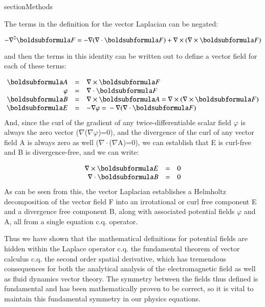\documentclass[twoside,final]{article}
\begin{document}
{section{Methods}

The terms in the definition for the vector Laplacian can be negated:

\begin{equation}
-\nabla ^2\boldsubformula F=-\nabla (\nabla \cdot \boldsubformula F)+\nabla \times (\nabla \times \boldsubformula F)
\end{equation}

and then the terms in this identity can be written out to define a vector field
for each of these terms:  

\begin{equation}\label{seq:refText5}
\begin{matrix}\hfill \boldsubformula A&=&\nabla \times \boldsubformula F\hfill\null \\\hfill \varphi &=&\nabla \cdot
\boldsubformula F\hfill\null \\\hfill \boldsubformula B&=&\nabla \times \boldsubformula A\text{ = }\nabla \times
(\nabla \times \boldsubformula F)\hfill\null \\\hfill \boldsubformula E&=&-\nabla \varphi \text{ = }-\nabla (\nabla
\cdot \boldsubformula F)\hfill\null \end{matrix}
\end{equation}
And, since the curl of the gradient of any twice-differentiable scalar field
$\varphi $ is always the zero vector (${\nabla}${\texttimes}(${\nabla}$$\varphi
$)=0), and the divergence of the curl of any vector field A is always zero as
well (${\nabla}{\cdot}$(${\nabla}${\texttimes}A)=0), we can establish that E is
curl-free and B is divergence-free, and we can write: 

\begin{equation}
\begin{matrix}\hfill \nabla \times \boldsubformula E&=&0\hfill\null \\\hfill \nabla \cdot \boldsubformula
B&=&0\hfill\null \end{matrix}
\end{equation}
As can be seen from this, the vector Laplacian establishes a Helmholtz
decomposition of the vector field F into an irrotational or curl free component
E and a divergence free component B, along with associated potential fields
$\varphi $ and A, all from a single equation c.q. operator. 

Thus we have shown that the mathematical definitions for potential fields are
hidden within the Laplace operator c.q. the fundamental theorem of vector
calculus c.q. the second order spatial derivative, which has tremendous
consequences for both the analytical analysis of the electromagnetic field as
well as fluid dynamics vector theory. The symmetry between the fields thus
defined is fundamental and has been mathematically proven to be correct, so it
is vital to maintain this fundamental symmetry in our physics equations. 

}
\end{document}
